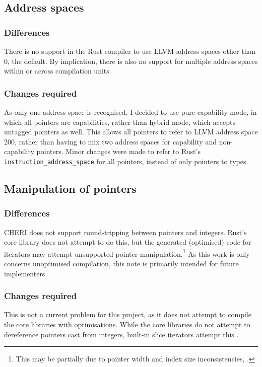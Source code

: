 \documentclass[dissertation.tex]{subfiles}
\begin{document}
\subsection{Address spaces}
\label{sec:impl-addrspace}

\subsubsection{Differences}
There is no support in the Rust compiler to use LLVM address spaces
other than 0, the default.
By implication, there is also no support for multiple address spaces
within or across compilation units.

\subsubsection{Changes required}
As only one address space is recognised, I decided to use pure
capability mode, in which all pointers are capabilities, rather than
hybrid mode, which accepts untagged pointers as well.
This allows all pointers to refer to LLVM address space 200, rather than
having to mix two address spaces for capability and non-capability
pointers.
Minor changes were made to refer to Rust's
\texttt{instruction\_address\_space} for all pointers, instead of only
pointers to types.


\subsection{Manipulation of pointers}
\label{sec:impl-manipulation}

\subsubsection{Differences}


CHERI does not support round-tripping between pointers and integers.
Rust's core library does not attempt to do this, but the generated
(optimised) code for iterators may attempt unsupported pointer
manipulation.\footnote{This may be partially due to pointer width and
index size inconsistencies, .}
As this work is only concerns unoptimised compilation, this note is
primarily intended for future implementers.

\subsubsection{Changes required}
This is not a current problem for this project, as it does not attempt
to compile the core libraries with optimisations.
While the core libraries do not attempt to dereference pointers cast
from integers, built-in slice iterators attempt this .
\end{document}
